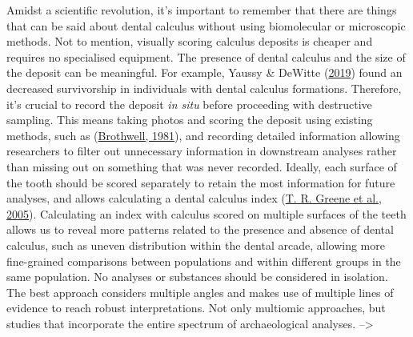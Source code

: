 \documentclass[
  letterpaper,
]{book}
\begin{document}
Amidst a scientific revolution, it's important to remember that there
are things that can be said about dental calculus without using
biomolecular or microscopic methods. Not to mention, visually scoring
calculus deposits is cheaper and requires no specialised equipment. The
presence of dental calculus and the size of the deposit can be
meaningful. For example, Yaussy \& DeWitte
(\protect\hyperlink{ref-yaussyCalculusSurvivorship2019}{2019}) found an
decreased survivorship in individuals with dental calculus formations.
Therefore, it's crucial to record the deposit \emph{in situ} before
proceeding with destructive sampling. This means taking photos and
scoring the deposit using existing methods, such as
(\protect\hyperlink{ref-brothwellDiggingBones1981}{Brothwell, 1981}),
and recording detailed information allowing researchers to filter out
unnecessary information in downstream analyses rather than missing out
on something that was never recorded. Ideally, each surface of the tooth
should be scored separately to retain the most information for future
analyses, and allows calculating a dental calculus index
(\protect\hyperlink{ref-greeneQuantifyingCalculus2005}{T. R. Greene et
al., 2005}). Calculating an index with calculus scored on multiple
surfaces of the teeth allows us to reveal more patterns related to the
presence and absence of dental calculus, such as uneven distribution
within the dental arcade, allowing more fine-grained comparisons between
populations and within different groups in the same population. No
analyses or substances should be considered in isolation. The best
approach considers multiple angles and makes use of multiple lines of
evidence to reach robust interpretations. Not only multiomic approaches,
but studies that incorporate the entire spectrum of archaeological
analyses. --\textgreater{}
\end{document}
